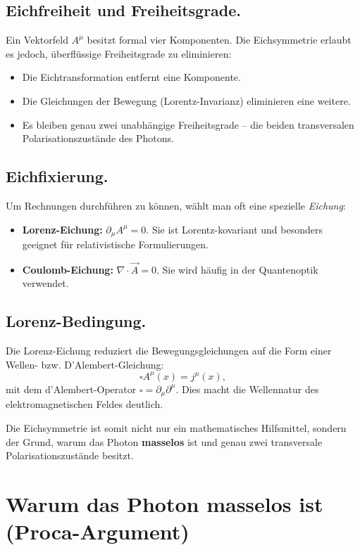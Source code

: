 \subsection*{Eichfreiheit und Freiheitsgrade.}
Ein Vektorfeld \( A^\mu \) besitzt formal vier Komponenten.  
Die Eichsymmetrie erlaubt es jedoch, überflüssige Freiheitsgrade zu eliminieren:
\begin{itemize}
	\item Die Eichtransformation entfernt eine Komponente.
	\item Die Gleichungen der Bewegung (Lorentz-Invarianz) 
	eliminieren eine weitere.
	\item Es bleiben genau zwei unabhängige Freiheitsgrade – 
	die beiden transversalen Polarisationszustände des Photons.
\end{itemize}

\subsection*{Eichfixierung.}
Um Rechnungen durchführen zu können, wählt man oft eine spezielle \emph{Eichung}:
\begin{itemize}
	\item \textbf{Lorenz-Eichung:} 
	\(\partial_\mu A^\mu = 0\).  
	Sie ist Lorentz-kovariant und besonders geeignet für relativistische Formulierungen.
	\item \textbf{Coulomb-Eichung:} 
	\(\nabla \cdot \vec{A} = 0\).  
	Sie wird häufig in der Quantenoptik verwendet.
\end{itemize}

\subsection*{Lorenz-Bedingung.}
Die Lorenz-Eichung reduziert die Bewegungsgleichungen auf die Form einer 
Wellen- bzw. D’Alembert-Gleichung:
\[
\square A^\mu(x) = j^\mu(x),
\]
mit dem d’Alembert-Operator \(\square = \partial_\mu \partial^\mu\).
Dies macht die Wellennatur des elektromagnetischen Feldes deutlich.

\medskip
Die Eichsymmetrie ist somit nicht nur ein mathematisches Hilfsmittel, 
sondern der Grund, warum das Photon \textbf{masselos} ist und 
genau zwei transversale Polarisationszustände besitzt.
\section{Warum das Photon masselos ist \newline (Proca-Argument)}
\label{anhangA:masselosigkeit_proca}

